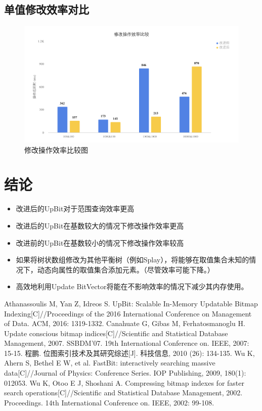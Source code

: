\documentclass[11pt, a4paper]{article}
\begin{document}
\subsection{单值修改效率对比}
\begin{figure}[H]
  \begin{center}
    \includegraphics[width=6.5in]{img/update.png}
    \caption{修改操作效率比较图}\label{fig:update}
  \end{center}
\end{figure}

\section{结论}

\begin{itemize}
\item 改进后的UpBit对于范围查询效率更高
\item 改进后的UpBit在基数较大的情况下修改操作效率更高
\item 改进前的UpBit在基数较小的情况下修改操作效率较高
\item 如果将树状数组修改为其他平衡树（例如Splay），将能够在取值集合未知的情况下，动态向属性的取值集合添加元素。（尽管效率可能下降。）
\item 高效地利用Update BitVector将能在不影响效率的情况下减少其内存使用。
\end{itemize}


\renewcommand\refname{参考文献}
\begin{thebibliography}{99}
Athanassoulis M, Yan Z, Idreos S. UpBit: Scalable In-Memory Updatable Bitmap Indexing[C]//Proceedings of the 2016 International Conference on Management of Data. ACM, 2016: 1319-1332.
Canahuate G, Gibas M, Ferhatosmanoglu H. Update conscious bitmap indices[C]//Scientific and Statistical Database Management, 2007. SSBDM'07. 19th International Conference on. IEEE, 2007: 15-15.
程鹏. 位图索引技术及其研究综述[J]. 科技信息, 2010 (26): 134-135.
Wu K, Ahern S, Bethel E W, et al. FastBit: interactively searching massive data[C]//Journal of Physics: Conference Series. IOP Publishing, 2009, 180(1): 012053.
Wu K, Otoo E J, Shoshani A. Compressing bitmap indexes for faster search operations[C]//Scientific and Statistical Database Management, 2002. Proceedings. 14th International Conference on. IEEE, 2002: 99-108.
\end{thebibliography}
\end{document}
